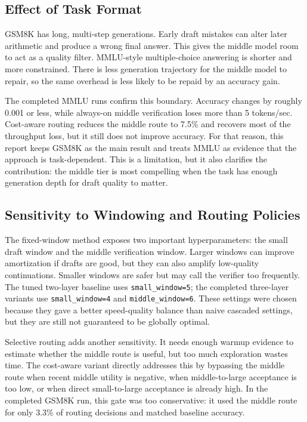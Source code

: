 \documentclass[11pt]{article}
\begin{document}
\subsection{Effect of Task Format}

GSM8K has long, multi-step generations. Early draft mistakes can alter later arithmetic and produce a wrong final answer. This gives the middle model room to act as a quality filter. MMLU-style multiple-choice answering is shorter and more constrained. There is less generation trajectory for the middle model to repair, so the same overhead is less likely to be repaid by an accuracy gain.

The completed MMLU runs confirm this boundary. Accuracy changes by roughly 0.001 or less, while always-on middle verification loses more than 5 tokens/sec. Cost-aware routing reduces the middle route to 7.5\% and recovers most of the throughput loss, but it still does not improve accuracy. For that reason, this report keeps GSM8K as the main result and treats MMLU as evidence that the approach is task-dependent. This is a limitation, but it also clarifies the contribution: the middle tier is most compelling when the task has enough generation depth for draft quality to matter.

\subsection{Sensitivity to Windowing and Routing Policies}

The fixed-window method exposes two important hyperparameters: the small draft window and the middle verification window. Larger windows can improve amortization if drafts are good, but they can also amplify low-quality continuations. Smaller windows are safer but may call the verifier too frequently. The tuned two-layer baseline uses \texttt{small\_window=5}; the completed three-layer variants use \texttt{small\_window=4} and \texttt{middle\_window=6}. These settings were chosen because they gave a better speed-quality balance than naive cascaded settings, but they are still not guaranteed to be globally optimal.

Selective routing adds another sensitivity. It needs enough warmup evidence to estimate whether the middle route is useful, but too much exploration wastes time. The cost-aware variant directly addresses this by bypassing the middle route when recent middle utility is negative, when middle-to-large acceptance is too low, or when direct small-to-large acceptance is already high. In the completed GSM8K run, this gate was too conservative: it used the middle route for only 3.3\% of routing decisions and matched baseline accuracy.
\end{document}
